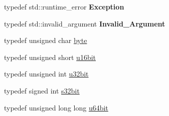 \begin{DoxyCompactItemize}
\item 
\hypertarget{namespaceBotan_a78f01593c683b481bd50bd8b5983918d}{typedef std\-::runtime\-\_\-error {\bfseries Exception}}\label{namespaceBotan_a78f01593c683b481bd50bd8b5983918d}

\item 
\hypertarget{namespaceBotan_a8ded03bdd23a0e812a20d922746349d0}{typedef std\-::invalid\-\_\-argument {\bfseries Invalid\-\_\-\-Argument}}\label{namespaceBotan_a8ded03bdd23a0e812a20d922746349d0}

\item 
typedef unsigned char \hyperlink{namespaceBotan_a7d793989d801281df48c6b19616b8b84}{byte}
\item 
typedef unsigned short \hyperlink{namespaceBotan_ab07face63a00c39ea6ed97f203ee501c}{u16bit}
\item 
typedef unsigned int \hyperlink{namespaceBotan_aacc7d03c95e97e76168fc1c819031830}{u32bit}
\item 
typedef signed int \hyperlink{namespaceBotan_a28e03d327abd4d5b1e7091e8d80d5cfe}{s32bit}
\item 
typedef unsigned long long \hyperlink{namespaceBotan_a634063d9fb05e25262ca94ed927030f6}{u64bit}
\end{DoxyCompactItemize}
